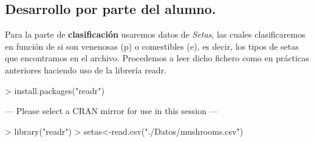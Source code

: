 \documentclass [a4paper] {article}
\begin{document}
\subsection{Desarrollo por parte del alumno.}

\bigskip
Para la parte de \textbf{clasificación} usaremos datos de \textit{Setas}, las cuales clasificaremos en función de si son venenosas (p) o 
comestibles (e), es decir, los tipos de setas que encontramos en el archivo. Procedemos a leer dicho fichero como en prácticas anteriores
haciendo uso de la librería readr.
\begin{Schunk}
\begin{Sinput}
> install.packages("readr")
\end{Sinput}
\begin{Soutput}
--- Please select a CRAN mirror for use in this session ---
\end{Soutput}
\begin{Sinput}
> library("readr")
> setas<-read.csv("./Datos/mushrooms.csv")
\end{Sinput}
\end{Schunk}
\end{document}
